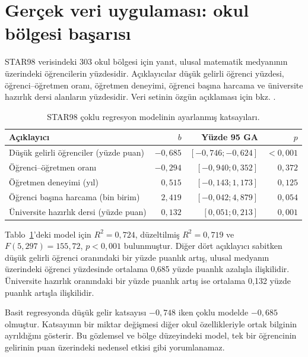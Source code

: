 \section{Gerçek veri uygulaması: okul bölgesi başarısı}

STAR98 verisindeki 303 okul bölgesi için yanıt, ulusal matematik medyanının
üzerindeki öğrencilerin yüzdesidir. Açıklayıcılar düşük gelirli öğrenci
yüzdesi, öğrenci--öğretmen oranı, öğretmen deneyimi, öğrenci başına harcama ve
üniversite hazırlık dersi alanların yüzdesidir. Veri setinin özgün açıklaması
için bkz. \citet{gill2001}.

\begin{table}[H]
\centering
\small
\caption{STAR98 çoklu regresyon modelinin ayarlanmış katsayıları.}
\label{tab:multiple-coefficients}
\begin{tabularx}{\textwidth}{@{}>{\raggedright\arraybackslash}Xrrr@{}}
\toprule
Açıklayıcı & $b$ & Yüzde 95 GA & $p$ \\
\midrule
Düşük gelirli öğrenciler (yüzde puan) & $-0{,}685$ & $[-0{,}746;-0{,}624]$ & $<0{,}001$ \\
Öğrenci--öğretmen oranı & $-0{,}294$ & $[-0{,}940;0{,}352]$ & $0{,}372$ \\
Öğretmen deneyimi (yıl) & $0{,}515$ & $[-0{,}143;1{,}173]$ & $0{,}125$ \\
Öğrenci başına harcama (bin birim) & $2{,}419$ & $[-0{,}042;4{,}879]$ & $0{,}054$ \\
Üniversite hazırlık dersi (yüzde puan) & $0{,}132$ & $[0{,}051;0{,}213]$ & $0{,}001$ \\
\bottomrule
\end{tabularx}
\end{table}

Tablo~\ref{tab:multiple-coefficients}'deki model için $R^2=0{,}724$,
düzeltilmiş $R^2=0{,}719$ ve
$F(5,297)=155{,}72$, $p<0{,}001$ bulunmuştur. Diğer dört açıklayıcı sabitken
düşük gelirli öğrenci oranındaki bir yüzde puanlık artış, ulusal medyanın
üzerindeki öğrenci yüzdesinde ortalama 0,685 yüzde puanlık azalışla
ilişkilidir. Üniversite hazırlık oranındaki bir yüzde puanlık artış ise
ortalama 0,132 yüzde puanlık artışla ilişkilidir.

Basit regresyonda düşük gelir katsayısı $-0{,}748$ iken çoklu modelde
$-0{,}685$ olmuştur. Katsayının bir miktar değişmesi diğer okul özellikleriyle
ortak bilginin ayrıldığını gösterir. Bu gözlemsel ve bölge düzeyindeki model,
tek bir öğrencinin gelirinin puan üzerindeki nedensel etkisi gibi
yorumlanamaz.

